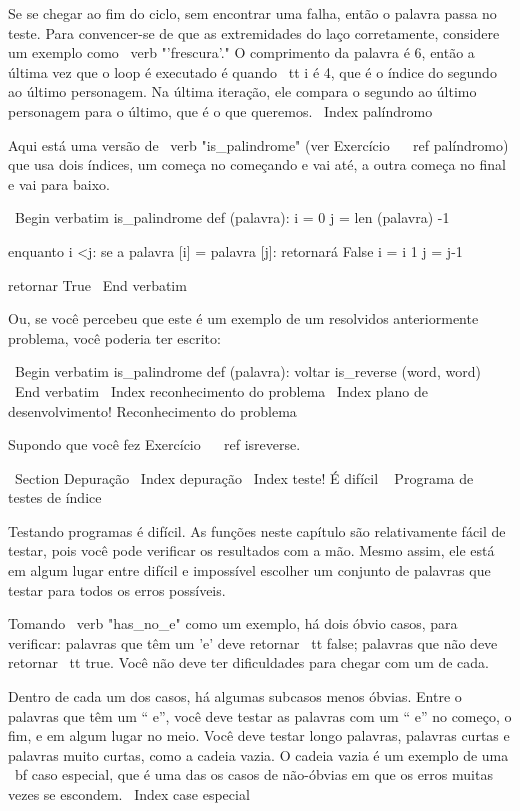 \documentclass[10pt]{book}
\begin{document}
\begin {itemize}
{{{{{{Se se chegar ao fim do ciclo, sem encontrar uma falha, então o
palavra passa no teste. Para convencer-se de que as extremidades do laço
corretamente, considere um exemplo como \ verb "'frescura'." O
comprimento da palavra é 6, então
a última vez que o loop é executado é quando {\ tt i} é 4, que é o
índice do segundo ao último personagem. Na última iteração,
ele compara o segundo ao último personagem para o último, que é
o que queremos.
\ Index {palíndromo}

Aqui está uma versão de \ verb "is_palindrome" (ver
Exercício ~ \ ref {palíndromo}) que usa dois índices, um começa no
começando e vai até, a outra começa no final e vai para baixo.

\ Begin {verbatim}
is_palindrome def (palavra):
    i = 0
    j = len (palavra) -1

    enquanto i <j:
        se a palavra [i] = palavra [j]:
            retornará False
        i = i 1
        j = j-1

    retornar True
\ End {verbatim}

Ou, se você percebeu que este é um exemplo de um resolvidos anteriormente
problema, você poderia ter escrito:

\ Begin {verbatim}
is_palindrome def (palavra):
    voltar is_reverse (word, word)
\ End {verbatim}
\ Index {reconhecimento do problema}
\ Index {plano de desenvolvimento! Reconhecimento do problema}

Supondo que você fez Exercício ~ \ ref {} isreverse.


\ Section {} Depuração
\ Index {depuração}
\ Index {teste! É difícil}
\ {} Programa de testes de índice

Testando programas é difícil. As funções neste capítulo são
relativamente fácil de testar, pois você pode verificar os resultados com a mão.
Mesmo assim, ele está em algum lugar entre difícil e impossível escolher um
conjunto de palavras que testar para todos os erros possíveis.

Tomando \ verb "has_no_e" como um exemplo, há dois óbvio
casos, para verificar: palavras que têm um 'e' deve retornar {\ tt false};
palavras que não deve retornar {\ tt true}. Você não deve ter
dificuldades para chegar com um de cada.

Dentro de cada um dos casos, há algumas subcasos menos óbvias. Entre o
palavras que têm um `` e'', você deve testar as palavras com um `` e'' no
começo, o fim, e em algum lugar no meio. Você deve testar longo
palavras, palavras curtas e palavras muito curtas, como a cadeia vazia. O
cadeia vazia é um exemplo de uma {\ bf caso especial}, que é uma das
os casos de não-óbvias em que os erros muitas vezes se escondem.
\ Index {case especial}

}}}}}}
\end{itemize}
\end{document}
